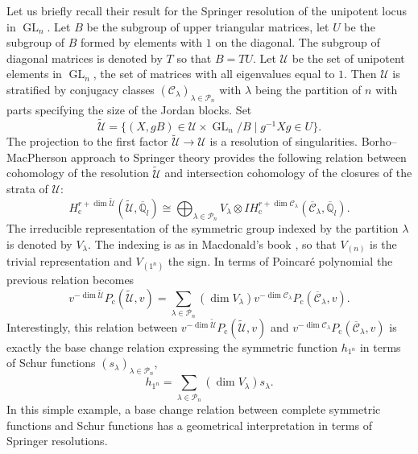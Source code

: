 \documentclass[JEP,XML,SOM,NoEqCountersInSection,Unicode,published]{cedram}
\newcommand{\rc}{\mathrm{c}}
\theoremstyle{definition}
\theoremstyle{plain}
\DeclareMathOperator{\GL}{GL}
\newcommand{\qlbar}{\overline{\mathbb{Q}}_l}
\newcommand{\IH}{\mathit{IH}}
\newcommand{\Part}{\mathcal{P}}
\newcommand{\inv}{^{-1}}
\begin{document}
Let us briefly recall their result for the Springer resolution of the unipotent locus in $\GL_n$. Let $B$ be the subgroup of upper triangular matrices, let $U$ be the subgroup of $B$ formed by elements with $1$ on the diagonal. The subgroup of diagonal matrices is denoted by $T$ so that $B=T U$. Let $\mathcal{U}$ be the set of unipotent elements in $\GL_n$, \ie the set of matrices with all eigenvalues equal to $1$. Then $\mathcal{U}$ is stratified by conjugacy classes $\left(\mathcal{C}_{\lambda}\right)_{\lambda\in\Part_n}$ with $\lambda$ being the partition of $n$ with parts specifying the size of the Jordan blocks. Set
\[
\widetilde{\mathcal{U}}=\lbrace (X, g B)\in\mathcal{U}\times \GL_n/B \mid g\inv X g \in U \rbrace.
\]
The projection to the first factor $\widetilde{\mathcal{U}}\to\mathcal{U}$ is a resolution of singularities. Borho--MacPherson approach to Springer theory provides the following relation between cohomology of the resolution $\widetilde{\mathcal{U}}$ and intersection cohomology of the closures of the strata of $\mathcal{U}$:
\[
H_\rc^{r+\dim \widetilde{\mathcal{U}}}(\widetilde{\mathcal{U}}, \qlbar) \cong \bigoplus_{\lambda \in \Part_n} V_{\lambda} \otimes \IH_{\rc}^{r+\dim \mathcal{C}_{\lambda}}(\overline{\mathcal{C}}_{\lambda},\qlbar).
\]
The irreducible representation of the symmetric group indexed by the partition $\lambda$ is denoted by $V_{\lambda}$. The indexing is as in Macdonald's book \cite{Macdonald}, so that $V_{(n)}$ is the trivial representation and $V_{(1^n)}$ the sign. In terms of Poincaré polynomial the previous relation becomes
\[
v^{-\dim \widetilde{\mathcal{U}}} P_{\rc}(\widetilde{\mathcal{U}},v) = \sum_{\lambda\in \Part_n}(\dim V_{\lambda}) v^{-\dim \mathcal{C}_{\lambda}} P_{\rc}(\overline{\mathcal{C}}_{\lambda},v).
\]
Interestingly, this relation between $v^{-\dim \widetilde{\mathcal{U}}} P_{\rc}(\widetilde{\mathcal{U}},v)$ and $v^{-\dim \mathcal{C}_{\lambda}}P_{\rc}(\overline{\mathcal{C}}_{\lambda},v)$ is exactly the base change relation expressing the symmetric function $h_{1^n}$ in terms of Schur functions $\left(s_{\lambda}\right)_{\lambda\in\Part_n}$,
\[
h_{1^n} = \sum_{\lambda\in\Part_n} (\dim V_{\lambda}) s_{\lambda}.
\]
In this simple example, a base change relation between complete symmetric functions and Schur functions has a geometrical interpretation in terms of Springer resolutions.
\end{document}
